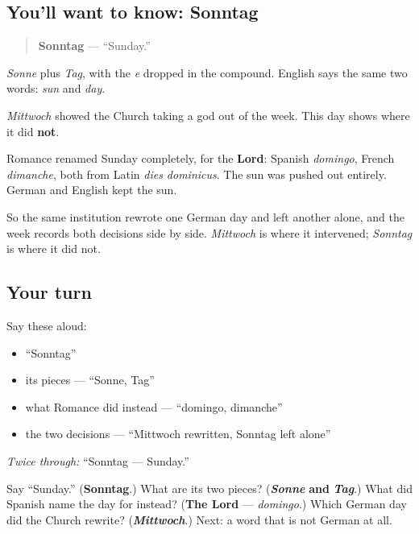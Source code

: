 \subsection*{You'll want to know: Sonntag}
\begin{quote}
\textbf{Sonntag} — \textquotedblleft{}Sunday.\textquotedblright{}
\end{quote}

\emph{Sonne} plus \emph{Tag}, with the \emph{e} dropped in the compound. English says the same two words: \emph{sun} and \emph{day}.

\begin{culture}
\emph{Mittwoch} showed the Church taking a god out of the week. This day shows where it did \textbf{not}.

Romance renamed Sunday completely, for the \textbf{Lord}: Spanish \emph{domingo}, French \emph{dimanche}, both from Latin \emph{dies dominicus}. The sun was pushed out entirely. German and English kept the sun.

So the same institution rewrote one German day and left another alone, and the week records both decisions side by side. \emph{Mittwoch} is where it intervened; \emph{Sonntag} is where it did not.
\end{culture}

\subsection*{Your turn}
Say these aloud:

\begin{itemize}
\raggedright
  \item \textquotedblleft{}Sonntag\textquotedblright{}
  \item its pieces — \textquotedblleft{}Sonne, Tag\textquotedblright{}
  \item what Romance did instead — \textquotedblleft{}domingo, dimanche\textquotedblright{}
  \item the two decisions — \textquotedblleft{}Mittwoch rewritten, Sonntag left alone\textquotedblright{}
\end{itemize}

\emph{Twice through:} \textquotedblleft{}Sonntag — Sunday.\textquotedblright{}

\begin{tcolorbox}[breakable,colback=teal!4,colframe=teal!35!black,title={Before you move on}]
Say \textquotedblleft{}Sunday.\textquotedblright{} (\textbf{Sonntag}.) What are its two pieces? (\emph{\textbf{Sonne}} \textbf{and} \emph{\textbf{Tag}}.) What did Spanish name the day for instead? (\textbf{The Lord} — \emph{domingo}.) Which German day did the Church rewrite? (\emph{\textbf{Mittwoch}}.) Next: a word that is not German at all.
\end{tcolorbox}
